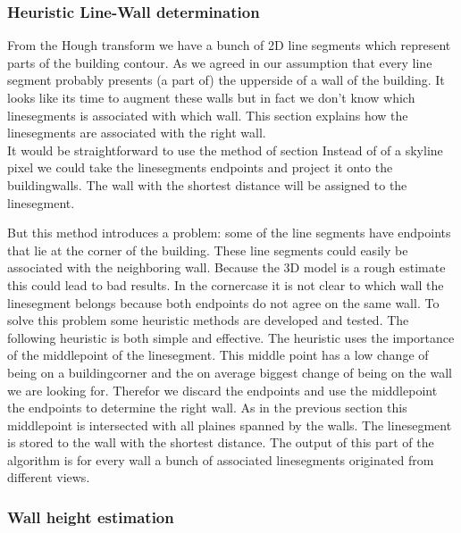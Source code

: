 \subsubsection{Heuristic Line-Wall determination}
	From the Hough transform we have a bunch of 2D line segments which represent parts of the building contour. 
	As we agreed in our assumption that every line segment probably presents (a part of) the upperside of a wall of the building.
	It looks like its time to augment these walls but in fact we don't know which linesegments is associated with which wall.
	This section explains how the linesegments are associated with the right wall.\\

	It would be straightforward to use the method of section %
	Instead of of a skyline pixel we could take the linesegments endpoints and project it onto the buildingwalls. The wall with the shortest distance will be assigned to the linesegment.

	But this method introduces a problem: some of the line segments have endpoints that lie at the corner of the building. These line segments could easily be associated with the neighboring wall. Because the 3D model is a rough estimate this could lead to bad results.
	In the cornercase it is not clear to which wall the linesegment belongs because both endpoints do not agree on the same wall. To solve this problem some heuristic methods are developed and tested. The following heuristic is both simple and effective.
	The heuristic uses the importance of the middlepoint of the linesegment. This middle point has a low change of being on a buildingcorner and the on average biggest change of being on the wall we are looking for.
	Therefor we discard the endpoints and use the middlepoint the endpoints to determine the right wall.
	As in the previous section %
	this middlepoint is intersected with all plaines spanned by the walls. The linesegment is stored to the wall with the shortest distance.
	The output of this part of the algorithm is for every wall a bunch of associated linesegments originated from different views.


\subsubsection{Wall height estimation}



